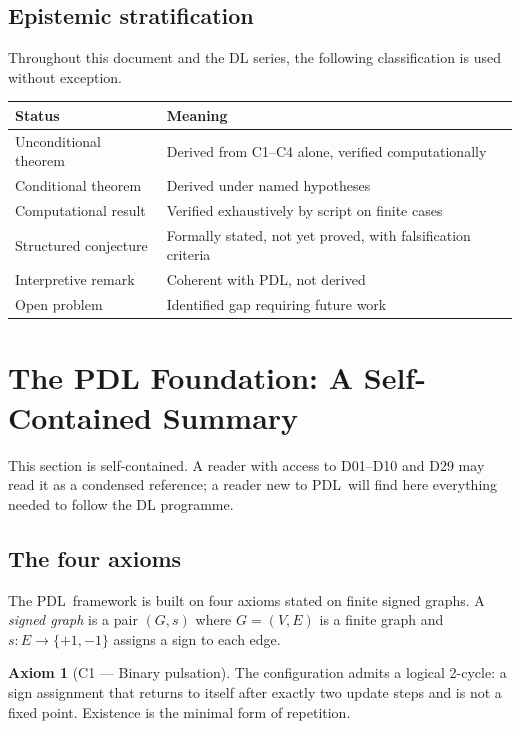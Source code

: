 \documentclass[12pt,a4paper]{article}
\theoremstyle{plain}
\theoremstyle{definition}
\newtheorem{axiom}{Axiom}
\theoremstyle{remark}
\newcommand{\PDL}{\textsc{PDL}}
\begin{document}
\subsection{Epistemic stratification}

Throughout this document and the DL series, the following classification is used
without exception.

\begin{center}
\begin{tabular}{p{4.1cm}p{10.4cm}}
\toprule
\textbf{Status} & \textbf{Meaning} \\
\midrule
Unconditional theorem & Derived from C1--C4 alone, verified computationally \\
Conditional theorem & Derived under named hypotheses \\
Computational result & Verified exhaustively by script on finite cases \\
Structured conjecture & Formally stated, not yet proved, with falsification criteria \\
Interpretive remark & Coherent with \PDL, not derived \\
Open problem & Identified gap requiring future work \\
\bottomrule
\end{tabular}
\end{center}

\section{The PDL Foundation: A Self-Contained Summary}
\label{sec:foundation}

This section is self-contained. A reader with access to D01--D10 and D29 may read it
as a condensed reference; a reader new to \PDL\ will find here everything needed to
follow the DL programme.

\subsection{The four axioms}

The \PDL\ framework is built on four axioms stated on finite signed graphs. A
\emph{signed graph} is a pair $(G, s)$ where $G = (V, E)$ is a finite graph and
$s: E \to \{+1, -1\}$ assigns a sign to each edge.

\begin{axiom}[C1 --- Binary pulsation]
The configuration admits a logical 2-cycle: a sign assignment that returns to itself
after exactly two update steps and is not a fixed point. Existence is the minimal
form of repetition.
\end{axiom}
\end{document}
